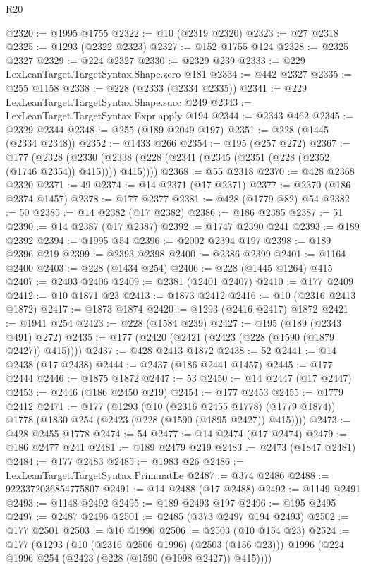 \begin{lexlean}{R20}
\begin{coremodule}
@2320 := @1995 @1755
@2322 := @10 (@2319 @2320)
@2323 := @27 @2318
@2325 := @1293 (@2322 @2323)
@2327 := @152 @1755 @124
@2328 := @2325 @2327
@2329 := @224 @2327
@2330 := @2329 @239
@2333 := @229 LexLeanTarget.TargetSyntax.Shape.zero @181
@2334 := @442 @2327
@2335 := @255 @1158
@2338 := @228 (@2333 (@2334 @2335))
@2341 := @229 LexLeanTarget.TargetSyntax.Shape.succ @249
@2343 := LexLeanTarget.TargetSyntax.Expr.apply @194
@2344 := @2343 @462
@2345 := @2329 @2344
@2348 := @255 (@189 @2049 @197)
@2351 := @228 (@1445 (@2334 @2348))
@2352 := @1433 @266
@2354 := @195 (@257 @272)
@2367 := @177
    (@2328 (@2330 (@2338 (@228 (@2341 (@2345 (@2351 (@228 (@2352 (@1746 @2354)) @415)))) @415))))
@2368 := @55 @2318
@2370 := @428 @2368 @2320
@2371 := 49
@2374 := @14 @2371 (@17 @2371)
@2377 := @2370 (@186 @2374 @1457)
@2378 := @177 @2377
@2381 := @428 (@1779 @82) @54
@2382 := 50
@2385 := @14 @2382 (@17 @2382)
@2386 := @186 @2385
@2387 := 51
@2390 := @14 @2387 (@17 @2387)
@2392 := @1747 @2390 @241
@2393 := @189 @2392
@2394 := @1995 @54
@2396 := @2002 @2394 @197
@2398 := @189 @2396 @219
@2399 := @2393 @2398
@2400 := @2386 @2399
@2401 := @1164 @2400
@2403 := @228 (@1434 @254)
@2406 := @228 (@1445 @1264) @415
@2407 := @2403 @2406
@2409 := @2381 (@2401 @2407)
@2410 := @177 @2409
@2412 := @10 @1871 @23
@2413 := @1873 @2412
@2416 := @10 (@2316 @2413 @1872)
@2417 := @1873 @1874
@2420 := @1293 (@2416 @2417) @1872
@2421 := @1941 @254
@2423 := @228 (@1584 @239)
@2427 := @195 (@189 (@2343 @491) @272)
@2435 := @177 (@2420 (@2421 (@2423 (@228 (@1590 (@1879 @2427)) @415))))
@2437 := @428 @2413 @1872
@2438 := 52
@2441 := @14 @2438 (@17 @2438)
@2444 := @2437 (@186 @2441 @1457)
@2445 := @177 @2444
@2446 := @1875 @1872
@2447 := 53
@2450 := @14 @2447 (@17 @2447)
@2453 := @2446 (@186 @2450 @219)
@2454 := @177 @2453
@2455 := @1779 @2412
@2471 := @177
    (@1293
      (@10 (@2316 @2455 @1778) (@1779 @1874))
      @1778
      (@1830 @254 (@2423 (@228 (@1590 (@1895 @2427)) @415))))
@2473 := @428 @2455 @1778
@2474 := 54
@2477 := @14 @2474 (@17 @2474)
@2479 := @186 @2477 @241
@2481 := @189 @2479 @219
@2483 := @2473 (@1847 @2481)
@2484 := @177 @2483
@2485 := @1983 @26
@2486 := LexLeanTarget.TargetSyntax.Prim.natLe
@2487 := @374 @2486
@2488 := 9223372036854775807
@2491 := @14 @2488 (@17 @2488)
@2492 := @1149 @2491
@2493 := @1148 @2492
@2495 := @189 @2493 @197
@2496 := @195 @2495
@2497 := @2487 @2496
@2501 := @2485 (@373 @2497 @194 @2493)
@2502 := @177 @2501
@2503 := @10 @1996
@2506 := @2503 (@10 @154 @23)
@2524 := @177
    (@1293
      (@10 (@2316 @2506 @1996) (@2503 (@156 @23)))
      @1996
      (@224 @1996 @254 (@2423 (@228 (@1590 (@1998 @2427)) @415))))

\end{coremodule}
\end{lexlean}
